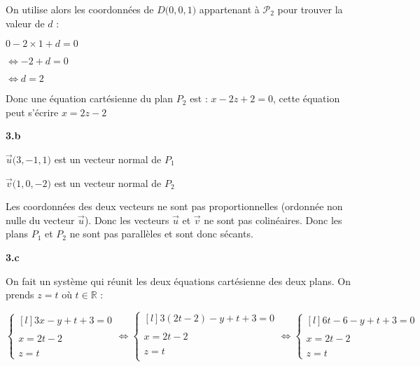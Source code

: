\documentclass{article}
\begin{document}
\noindent On utilise alors les coordonnées de $D\Big(0, 0, 1\Big)$ appartenant à $\mathscr{P_2}$ pour trouver la valeur de $d$ :

\vspace{2mm}

$0 - 2\times 1 + d = 0$

$\Leftrightarrow -2 + d = 0$

$\Leftrightarrow d = 2$

\vspace{2mm}

\noindent Donc une équation cartésienne du plan $P_2$ est : $x - 2z + 2 = 0$, cette équation peut s'écrire $x = 2z-2$

\vspace{2mm}

\textbf{3.b}

\vspace{2mm}

$\overrightarrow{u} \Big(3, -1, 1\Big)$ est un vecteur normal de $P_1$

\vspace{2mm}

$\overrightarrow{v} \Big(1, 0, -2\Big)$ est un vecteur normal de $P_2$

\vspace{2mm}

Les coordonnées des deux vecteurs ne sont pas proportionnelles (ordonnée non nulle du vecteur $\overrightarrow{u}$). Donc les vecteurs $\overrightarrow{u}$ et $\overrightarrow{v}$ ne sont pas colinéaires. Donc les plans $P_1$ et $P_2$ ne sont pas parallèles et sont donc sécants.

\vspace{2mm}

\textbf{3.c}

\vspace{2mm}

\noindent On fait un système qui réunit les deux équations cartésienne des deux plans. On prends $z = t$ où $t \in \mathbb{R}$ :

\vspace{2mm}

$\left\{\begin{matrix*}[l]
   3x-y+t+3=0\\
   \\
   x = 2t - 2\\
   \\
   z = t
\end{matrix*}\right.
\Leftrightarrow
\left\{\begin{matrix*}[l]
   3(2t-2) - y + t+ 3 = 0\\
   \\
   x=2t-2\\
   \\
   z= t\\
\end{matrix*}\right.
\Leftrightarrow
\left\{\begin{matrix*}[l]
   6t-6-y+t+3=0\\
   \\
   x=2t-2\\
   \\
   z=t
\end{matrix*}\right.
$
\end{document}
